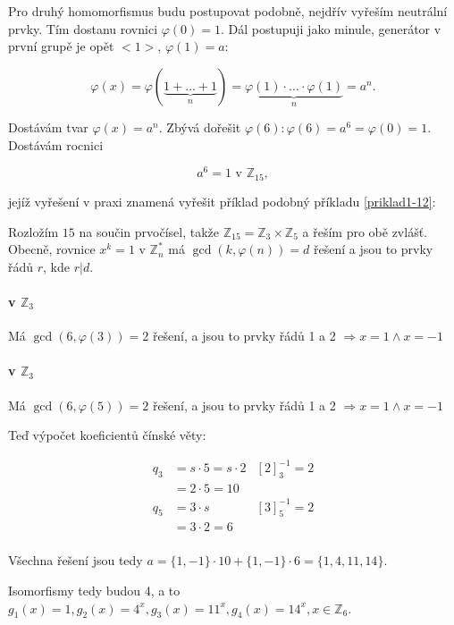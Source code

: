 \documentclass{article}
\begin{document}
Pro druhý homomorfismus budu postupovat podobně, nejdřív vyřeším neutrální prvky. Tím dostanu rovnici $\varphi(0) = 1$. Dál postupuji jako minule, generátor v první grupě je opět ${<}1{>}$, $\varphi(1) = a$:


\[ \varphi(x) = \varphi(\underbrace{1+\ldots+1}_{n}) = \underbrace{\varphi(1) \cdot \ldots \cdot \varphi(1)}_{n} = 
 a^n. \]

Dostávám tvar $\varphi(x)=a^n$. Zbývá dořešit $\varphi(6): \varphi(6) = a^6 = \varphi(0) = 1$. Dostávám rocnici

\[ a^6 = 1 \mbox{ v } \mathbb{Z}_{15}, \]

jejíž vyřešení v praxi znamená vyřešit příklad podobný příkladu \ref{priklad1-12}:

Rozložím $15$ na součin prvočísel, takže $\mathbb{Z}_{15} = \mathbb{Z}_{3} \times \mathbb{Z}_{5}$ a řeším pro obě zvlášť. Obecně, rovnice $x^k = 1$ v $\mathbb{Z}_n^*$ má $\gcd(k, \varphi(n)) = d$ řešení a jsou to prvky řádů $r$, kde $r|d$.

\paragraph{v $\mathbb{Z}_3$}
Má $\gcd(6,\varphi(3)) = 2$ řešení, a jsou to prvky řádů 1 a 2 $\Rightarrow x = 1 \wedge x = -1$ 

\paragraph{v $\mathbb{Z}_3$}
Má $\gcd(6,\varphi(5)) = 2$ řešení, a jsou to prvky řádů 1 a 2 $\Rightarrow x = 1 \wedge x = -1$ 

Teď výpočet koeficientů čínské věty:
 
\begin{align*}
q_3 & = s\cdot 5 = s\cdot 2 & \left[ 2\right]^{-1}_3 = 2\\
		& = 2 \cdot 5 = 10 \\
q_5 & = 3 \cdot s & \left[ 3\right]^{-1}_{5} = 2\\
		& = 3 \cdot 2 = 6 \\
\end{align*}

Všechna řešení jsou tedy $a = \{1,-1\}\cdot 10 + \{1,-1\}\cdot 6 = \{1,4,11,14\}$.

Isomorfismy tedy budou 4, a to $g_1(x) = 1,g_2(x) = 4^x,g_3(x) = 11^x,g_4(x) = 14^x, x \in \mathbb{Z}_6$.


\end{document}
